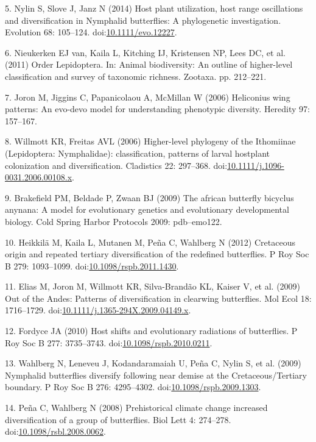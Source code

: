 \documentclass[10pt]{article}
\begin{document}
5. Nylin S, Slove J, Janz N (2014) Host plant utilization, host range
oscillations and diversification in Nymphalid butterflies: A
phylogenetic investigation. Evolution 68: 105--124.
doi:\href{http://dx.doi.org/10.1111/evo.12227}{10.1111/evo.12227}.

6. Nieukerken EJ van, Kaila L, Kitching IJ, Kristensen NP, Lees DC, et
al. (2011) Order Lepidoptera. In: Animal biodiversity: An outline of
higher-level classification and survey of taxonomic richness. Zootaxa.
pp. 212--221.

7. Joron M, Jiggins C, Papanicolaou A, McMillan W (2006) Heliconius wing
patterns: An evo-devo model for understanding phenotypic diversity.
Heredity 97: 157--167.

8. Willmott KR, Freitas AVL (2006) Higher-level phylogeny of the
Ithomiinae (Lepidoptera: Nymphalidae): classification, patterns of
larval hostplant colonization and diversification. Cladistics 22:
297--368.
doi:\href{http://dx.doi.org/10.1111/j.1096-0031.2006.00108.x}{10.1111/j.1096-0031.2006.00108.x}.

9. Brakefield PM, Beldade P, Zwaan BJ (2009) The african butterfly
bicyclus anynana: A model for evolutionary genetics and evolutionary
developmental biology. Cold Spring Harbor Protocols 2009: pdb--emo122.

10. Heikkilä M, Kaila L, Mutanen M, Peña C, Wahlberg N (2012) Cretaceous
origin and repeated tertiary diversification of the redefined
butterflies. P Roy Soc B 279: 1093--1099.
doi:\href{http://dx.doi.org/10.1098/rspb.2011.1430}{10.1098/rspb.2011.1430}.

11. Elias M, Joron M, Willmott KR, Silva-Brandão KL, Kaiser V, et al.
(2009) Out of the Andes: Patterns of diversification in clearwing
butterflies. Mol Ecol 18: 1716--1729.
doi:\href{http://dx.doi.org/10.1111/j.1365-294X.2009.04149.x}{10.1111/j.1365-294X.2009.04149.x}.

12. Fordyce JA (2010) Host shifts and evolutionary radiations of
butterflies. P Roy Soc B 277: 3735--3743.
doi:\href{http://dx.doi.org/10.1098/rspb.2010.0211}{10.1098/rspb.2010.0211}.

13. Wahlberg N, Leneveu J, Kodandaramaiah U, Peña C, Nylin S, et al.
(2009) Nymphalid butterflies diversify following near demise at the
Cretaceous/Tertiary boundary. P Roy Soc B 276: 4295--4302.
doi:\href{http://dx.doi.org/10.1098/rspb.2009.1303}{10.1098/rspb.2009.1303}.

14. Pe\~na C, Wahlberg N (2008) Prehistorical climate change increased
diversification of a group of butterflies. Biol Lett 4: 274--278.
doi:\href{http://dx.doi.org/10.1098/rsbl.2008.0062}{10.1098/rsbl.2008.0062}.
\end{document}
